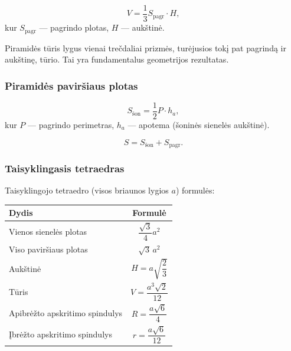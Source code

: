 \begin{tcolorbox}[colback=green!5!white, colframe=green!50!black, title=Piramidės tūrio formulė]
\[
    V = \frac{1}{3} S_{\text{pagr}} \cdot H,
\]
kur $S_{\text{pagr}}$ --- pagrindo plotas, $H$ --- aukštinė.
\end{tcolorbox}

\begin{remark}
Piramidės tūris lygus vienai trečdaliai prizmės, turėjusios tokį pat pagrindą ir aukštinę, tūrio. Tai yra fundamentalus geometrijos rezultatas.
\end{remark}

\subsubsection*{Piramidės paviršiaus plotas}

\begin{tcolorbox}[colback=blue!5!white, colframe=blue!50!black, title=Taisyklingosios piramidės šoninis paviršiaus plotas]
\[
    S_{\text{šon}} = \frac{1}{2} P \cdot h_a,
\]
kur $P$ --- pagrindo perimetras, $h_a$ --- apotema (šoninės sienelės aukštinė).
\end{tcolorbox}

\begin{tcolorbox}[colback=blue!5!white, colframe=blue!50!black, title=Viso paviršiaus plotas]
\[
    S = S_{\text{šon}} + S_{\text{pagr}}.
\]
\end{tcolorbox}

\subsubsection*{Taisyklingasis tetraedras}

Taisyklingojo tetraedro (visos briaunos lygios $a$) formulės:

\begin{center}
\renewcommand{\arraystretch}{1.8}
\begin{tabular}{|l|c|}
\hline
\textbf{Dydis} & \textbf{Formulė} \\
\hline
Vienos sienelės plotas & $\dfrac{\sqrt{3}}{4}a^2$ \\
\hline
Viso paviršiaus plotas & $\sqrt{3}\, a^2$ \\
\hline
Aukštinė & $H = a\sqrt{\dfrac{2}{3}}$ \\
\hline
Tūris & $V = \dfrac{a^3\sqrt{2}}{12}$ \\
\hline
Apibrėžto apskritimo spindulys & $R = \dfrac{a\sqrt{6}}{4}$ \\
\hline
Įbrėžto apskritimo spindulys & $r = \dfrac{a\sqrt{6}}{12}$ \\
\hline
\end{tabular}
\end{center}

